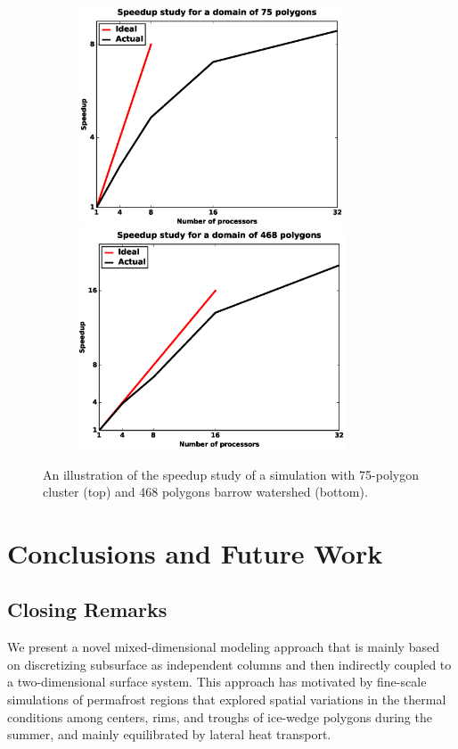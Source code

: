 \documentclass[review]{elsarticle}
\begin{document}
\begin{figure}[!htpb]
\centering
\includegraphics[height = 6.5cm, width=10cm]{figures/speedup-lcs-lobster.eps}
\includegraphics[height = 6.5cm, width=10cm]{figures/speedup-lcs-barrow.eps}
\caption{An illustration of the speedup study of a simulation with 75-polygon cluster (top) and 468 polygons barrow watershed (bottom).}
\label{lcs-speed}
\end{figure}


\section{Conclusions and Future Work}\label{conclusion}
\subsection{Closing Remarks}
We present a novel mixed-dimensional modeling approach that is mainly based on discretizing subsurface as independent columns and then indirectly coupled to a two-dimensional surface system. This approach has motivated by fine-scale simulations of permafrost regions that explored spatial variations in the thermal conditions among centers, rims, and troughs of ice-wedge polygons during the summer, and mainly equilibrated by lateral heat transport.
\end{document}
